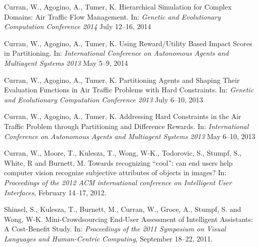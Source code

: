 \documentclass[10pt]{article}
\renewcommand{\section}[1]{\pagebreak[3]%
    \vspace{1.3\baselineskip}%
    \phantomsection\addcontentsline{toc}{section}{#1}%
    \noindent\llap{\scshape\smash{\parbox[t]{\marginparwidth}{\hyphenpenalty=10000\raggedright #1}}}%
    \vspace{-\baselineskip}\par}
\newcommand{\halfblankline}{\quad\vspace{-0.5\baselineskip}\pagebreak[3]}
\begin{document}
\begin{bibenum}
    \item Curran, W., Agogino, A., Tumer, K.
    Hierarchical Simulation for Complex Domains: Air Traffic Flow Management.
    In: \emph{Genetic and Evolutionary Computation Conference 2014} July 12--16, 2014   

    \item Curran, W., Agogino, A., Tumer, K.  
    Using Reward/Utility Based Impact Scores in Partitioning.
    In: \emph{International Conference on Autonomous Agents and Multiagent Systems 2013} May 5--9, 2014   
    
    \item Curran, W., Agogino, A., Tumer, K.  
    Partitioning Agents and Shaping Their Evaluation Functions in Air Traffic Problems with Hard Constraints.
    In: \emph{Genetic and Evolutionary Computation Conference 2013} July 6--10, 2013
    
    \item Curran, W., Agogino, A., Tumer, K.
    Addressing Hard Constraints in the Air Traffic Problem through Partitioning and Difference Rewards.
    In: \emph{International Conference on Autonomous Agents and Multiagent Systems 2013} May 6--10, 2013
    
    \item Curran, W., Moore, T., Kulesza, T., Wong, W-K., Todorovic, S., Stumpf, S., White, R and Burnett, M.
        Towards recognizing ``cool'': can end users help computer vision recognize subjective attributes of objects in images?
        In: \emph{Proceedings of the 2012 ACM international conference on Intelligent User Interfaces},
        February 14--17, 2012.
        
    \item Shinsel, S., Kulesza, T., Burnett, M., Curran, W., Groce, A., Stumpf, S. and Wong, W-K.
        Mini-Crowdsourcing End-User Assessment of Intelligent Assistants: A Cost-Benefit Study.
        In: \emph{Proceedings of the 2011 Symposium on Visual Languages and Human-Centric Computing}, September 18--22, 2011. 
 
\end{bibenum}


\halfblankline
\\
\end{document}
